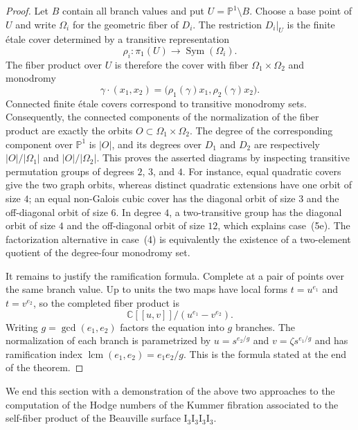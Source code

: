 \documentclass[a4paper]{amsart}
\theoremstyle{plain}
\theoremstyle{definition}
\theoremstyle{remark}
\numberwithin{equation}{section}
\newcommand{\CC}{\mathbb{C}}
\newcommand{\PP}{\mathbb{P}}
\begin{document}
\begin{proof}
Let $B$ contain all branch values and put $U=\PP^1\setminus B$.  Choose a
base point of $U$ and write $\Omega_i$ for the geometric fiber of $D_i$.
The restriction $D_i|_U$ is the finite étale cover determined by a
transitive representation
\[
\rho_i\colon\pi_1(U)\longrightarrow\operatorname{Sym}(\Omega_i).
\]
The fiber product over $U$ is therefore the cover with fiber
$\Omega_1\times\Omega_2$ and monodromy
\[
\gamma\cdot(x_1,x_2)=\bigl(\rho_1(\gamma)x_1,
\rho_2(\gamma)x_2\bigr).
\]
Connected finite étale covers correspond to transitive monodromy sets.
Consequently, the connected components of the normalization of the fiber
product are exactly the orbits $O\subset\Omega_1\times\Omega_2$.  The
degree of the corresponding component over $\PP^1$ is $|O|$, and its
degrees over $D_1$ and $D_2$ are respectively
$|O|/|\Omega_1|$ and $|O|/|\Omega_2|$.  This proves the asserted diagrams
by inspecting transitive permutation groups of degrees $2$, $3$, and $4$.
For instance, equal quadratic covers give the two graph orbits, whereas
distinct quadratic extensions have one orbit of size $4$; an equal
non-Galois cubic cover has the diagonal orbit of size $3$ and the
off-diagonal orbit of size $6$.  In degree $4$, a two-transitive group has
the diagonal orbit of size $4$ and the off-diagonal orbit of size $12$,
which explains case~(5e).  The factorization alternative in case~(4) is
equivalently the existence of a two-element quotient of the degree-four
monodromy set.

It remains to justify the ramification formula.  Complete at a pair of
points over the same branch value.  Up to units the two maps have local
forms $t=u^{e_1}$ and $t=v^{e_2}$, so the completed fiber product is
\[
\CC[[u,v]]/(u^{e_1}-v^{e_2}).
\]
Writing $g=\gcd(e_1,e_2)$ factors the equation into $g$ branches.  The
normalization of each branch is parametrized by
$u=s^{e_2/g}$ and $v=\zeta s^{e_1/g}$ and has ramification index
$\operatorname{lcm}(e_1,e_2)=e_1e_2/g$.  This is the formula stated at the
end of the theorem.
\end{proof}


We end this section with a demonstration of the above two approaches to the computation of the Hodge numbers of the Kummer fibration associated to the self-fiber product of the Beauville surface \textup{$\mathrm{I}_{3}\mathrm{I}_{3}\mathrm{I}_{3}\mathrm{I}_{3}$}.
\end{document}
